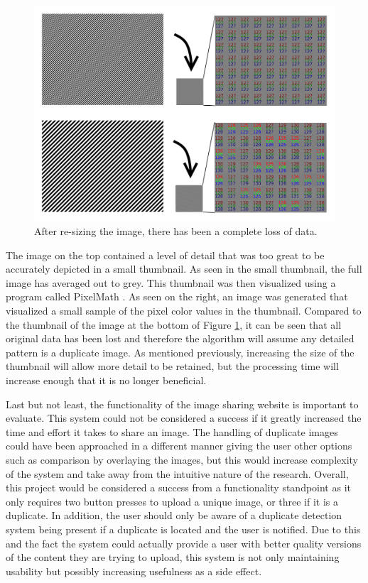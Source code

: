 \begin{figure}[htbp]
\centering
\includegraphics[width=5in]{dataloss}
\caption{After re-sizing the image, there has been a complete loss of data.}
\label{fig:dataloss}
\end{figure}

The image on the top contained a level of detail that was too great to be accurately depicted in a small thumbnail. As seen in the small thumbnail, the full image has averaged out to grey. This thumbnail was then visualized using a program called PixelMath \cite{pixelmath}. As seen on the right, an image was generated that visualized a small sample of the pixel color values in the thumbnail. Compared to the thumbnail of the image at the bottom of Figure \ref{fig:dataloss}, it can be seen that all original data has been lost and therefore the algorithm will assume any detailed pattern is a duplicate image. As mentioned previously, increasing the size of the thumbnail will allow more detail to be retained, but the processing time will increase enough that it is no longer beneficial.

Last but not least, the functionality of the image sharing website is important to evaluate. This system could not be considered a success if it greatly increased the time and effort it takes to share an image. The handling of duplicate images could have been approached in a different manner giving the user other options such as comparison by overlaying the images, but this would increase complexity of the system and take away from the intuitive nature of the research. Overall, this project would be considered a success from a functionality standpoint as it only requires two button presses to upload a unique image, or three if it is a duplicate. In addition, the user should only be aware of a duplicate detection system being present if a duplicate is located and the user is notified. Due to this and the fact the system could actually provide a user with better quality versions of the content they are trying to upload, this system is not only maintaining usability but possibly increasing usefulness as a side effect.